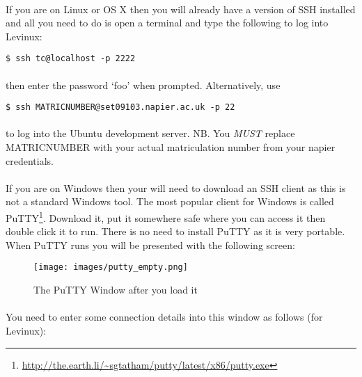 \documentclass[12pt, a4paper, twoside]{book}
\begin{document}
\paragraph{} If you are on Linux or OS X then you will already have a version of SSH installed and all you need to do is open a terminal and type the following to log into Levinux:

\begin{lstlisting}[style=DOS]
    $ ssh tc@localhost -p 2222
\end{lstlisting}

\paragraph{} then enter the password `foo' when prompted. Alternatively, use

\begin{lstlisting}[style=DOS]
    $ ssh MATRICNUMBER@set09103.napier.ac.uk -p 22
\end{lstlisting}

\paragraph{} to log into the Ubuntu development server. NB. You \emph{MUST} replace MATRICNUMBER with your actual matriculation number from your napier credentials.

\paragraph{} If you are on Windows then your will need to download an SSH client as this is not a standard Windows tool. The most popular client for Windows is called PuTTY\footnote{\url{http://the.earth.li/~sgtatham/putty/latest/x86/putty.exe}}. Download it, put it somewhere safe where you can access it then double click it to run. There is no need to install PuTTY as it is very portable. When PuTTY runs you will be presented with the following screen:

\begin{figure}[H]
\centering
\texttt{[image: images/putty\_empty.png]}
\caption{The PuTTY Window after you load it}
\label{fig:putty-empty}
\end{figure}

\paragraph{} You need to enter some connection details into this window as follows (for Levinux):
\end{document}
